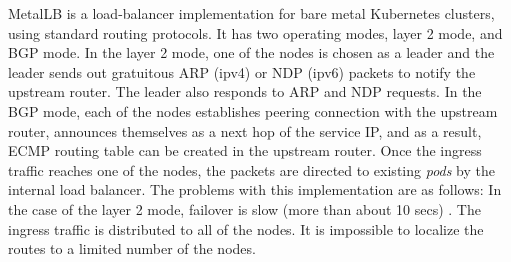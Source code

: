 MetalLB \cite{metallb} is a load-balancer implementation for bare metal Kubernetes clusters, using standard routing protocols.
It has two operating modes, layer 2 mode, and BGP mode.
In the layer 2 mode, one of the nodes is chosen as a leader and the leader sends out gratuitous ARP (ipv4) or NDP (ipv6) packets to notify the upstream router.
The leader also responds to ARP and NDP requests.
In the BGP mode, each of the nodes establishes peering connection with the upstream router, announces themselves as a next hop of the service IP, and as a result, ECMP routing table can be created in the upstream router.
Once the ingress traffic reaches one of the nodes, the packets are directed to existing {\em pods} by the internal load balancer.
The problems with this implementation are as follows:
In the case of the layer 2 mode, failover is slow (more than about 10 secs) \cite{metallb}.
The ingress traffic is distributed to all of the nodes.
It is impossible to localize the routes to a limited number of the nodes.

\begin{table}[h]
  \centering

  \par\bigskip
  \begin{minipage}{1.0\columnwidth}
    \caption[Comparison of software load balancers for Kubernetes]{
    Comparison of software load balancers for Kubernetes. 
  $^{*}$ Conventional technology uses cloud load balancers if available, which is not necessarily container friendly. 
  $^{**}$ Metallb also supports layer 2 mode, which uses unsolicited ARP or NDP packets to update layer 2 address table in the upstream router. 
  $^{***}$ The author plans to add XDP feature in future work.
    }   
    \label{tabl:k8s_lb}
  \end{minipage}

\end{table}

